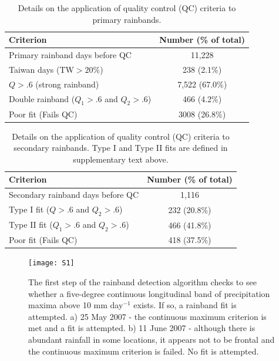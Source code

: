 \begin{table}

\caption{Details on the application of quality control (QC) criteria to primary rainbands.}
\centering

\begin{tabular}{ l c}
	 Criterion & Number (\% of total) \\
	 \hline
	 Primary rainband days before QC & 11,228 \\
	 Taiwan days (TW$>20\%$) & 238 (2.1\%) \\
	 $Q>.6$ (strong rainband) & 7,522 (67.0\%) \\
	 Double rainband ($Q_1>.6$ and $Q_2>.6$) & 466 (4.2\%) \\
	 Poor fit (Fails QC) & 3008 (26.8\%) \\
	 
\end{tabular}
\label{t52}
\end{table}

\begin{table}

\caption{Details on the application of quality control (QC) criteria to secondary rainbands. Type I and Type II fits are defined in supplementary text above.}
\centering

\begin{tabular}{ l c}
	 Criterion & Number (\% of total) \\
	 \hline
	 Secondary rainband days before QC & 1,116 \\
	 Type I fit ($Q>.6$ and $Q_2>.6$) & 232 (20.8\%) \\
	 Type II fit ($Q_1>.6$ and $Q_2>.6$) & 466 (41.8\%) \\
	 Poor fit (Fails QC) & 418 (37.5\%) \\
	 
\end{tabular}
\label{t53}
\end{table}


\begin{figure}

\noindent\texttt{[image: S1]}
\caption{The first step of the rainband detection algorithm checks to see whether a five-degree continuous longitudinal band of precipitation maxima above 10 mm day$^{-1}$ exists. If so, a rainband fit is attempted. a) 25 May 2007 - the continuous maximum criterion is met and a fit is attempted. b) 11 June 2007 - although there is abundant rainfall in some locations, it appears not to be frontal and the continuous maximum criterion is failed. No fit is attempted.}
\label{f51}
\end{figure}

